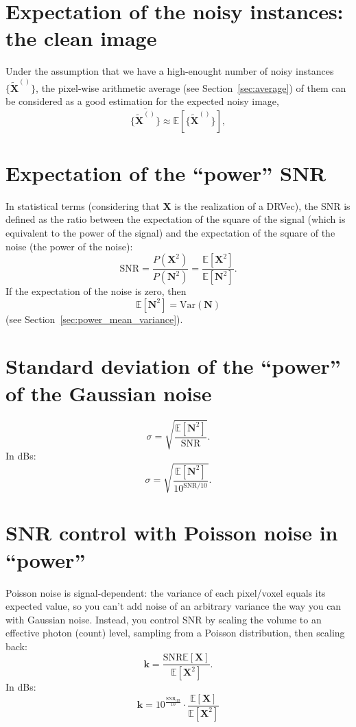 \section{Expectation of the noisy instances: the clean image}
Under the assumption that we have a high-enought number of noisy
instances $\{\tilde{\bm{X}}^{()}\}$, the pixel-wise
arithmetic average (see Section~\ref{sec:average}) of them can be
considered as a good estimation for the expected noisy image,
\begin{equation}
  \overline{\{\tilde{\bm{X}}^{()}\}} \approx \mathbb{E}[\{\tilde{\bm{X}}^{()}\}],
\end{equation}

\section{Expectation of the ``power'' \gls{SNR}}
In statistical terms (considering that $\bm{X}$ is the realization of
a \gls{DRVec}), the \gls{SNR} is defined as the ratio between the
expectation of the square of the signal (which is equivalent to the
power of the signal) and the expectation of the square of the noise
(the power of the noise):
\begin{equation}
  \text{SNR} = \frac{P(\bm{X}^2)}{P(\bm{N}^2)}=\frac{\mathbb{E}[\bm{X}^2]}{\mathbb{E}[\bm{N}^2]}.
  \label{eq:power_SNR_statistics}
\end{equation}
If the expectation of the noise is zero, then 
\begin{equation}
  \mathbb{E}[\bm{N}^2] = \text{Var}(\bm{N})
  \label{eq:expectation_variance}
\end{equation}
(see Section~\ref{sec:power_mean_variance}).

\section{Standard deviation of the ``power'' of the Gaussian noise}
\begin{equation}
  \sigma = \sqrt{\frac{\mathbb{E}[\bm{N}^2]}{\text{SNR}}}.
\end{equation}
In dBs:
\begin{equation}
  \sigma = \sqrt{\frac{\mathbb{E}[\bm{N}^2]}{10^{\text{SNR}/10}}}.
\end{equation}

\section{SNR control with Poisson noise in ``power''}
Poisson noise is signal-dependent: the variance of each pixel/voxel equals
its expected value, so you can't add noise of an arbitrary variance
the way you can with Gaussian noise. Instead, you control SNR by
scaling the volume to an effective photon (count) level, sampling from
a Poisson distribution, then scaling back:
\begin{equation}
  \bm{k} = \frac{\text{SNR}\mathbb{E}[\bm{X}]}{\mathbb{E}[\bm{X}^2]}.
\end{equation}
In dBs:
\begin{equation}
  \bm{k} = 10^{\frac{\text{SNR}_{\text{dB}}}{10}} \cdot \frac{\mathbb{E}[\bm{X}]}{\mathbb{E}[\bm{X}^2]}
\end{equation}

